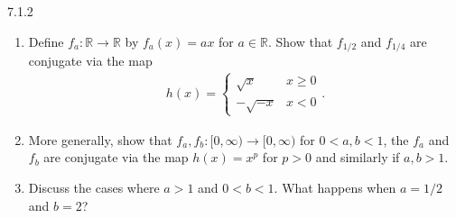 \begin{problem}{7.1.2}
  \begin{enumerate}
    \item Define $f_a: \mathbb{R} \to \mathbb{R}$ by $f_a(x) = ax$ for $a\in\mathbb{R}$.
      Show that $f_{1/2}$ and $f_{1/4}$ are conjugate via the map
      \begin{align}\label{h_homeo}
        h(x) =
        \begin{cases}
          \sqrt{x} & x \geq 0 \\
          -\sqrt{-x} & x < 0
        \end{cases}.
      \end{align}
    \item More generally, show that $f_a, f_b: [0, \infty) \to [0, \infty)$ for $0< a, b < 1$,
      the $f_a$ and $f_b$ are conjugate via the map $h(x) = x^p$ for $p > 0$ and similarly if $a, b > 1$.
    \item Discuss the cases where $a > 1$ and $0 < b < 1$. What happens when $a = 1/2$ and $b = 2$?
  \end{enumerate}
\end{problem}

